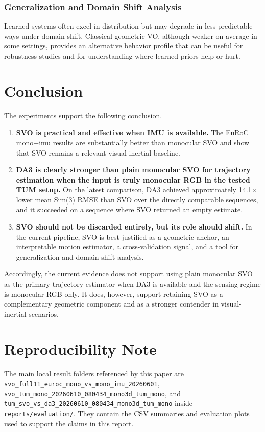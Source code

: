 \documentclass[conference]{IEEEtran}
\begin{document}
\subsubsection{Generalization and Domain Shift Analysis}
Learned systems often excel in-distribution but may degrade in less predictable ways under domain shift. Classical geometric VO, although weaker on average in some settings, provides an alternative behavior profile that can be useful for robustness studies and for understanding where learned priors help or hurt.

\section{Conclusion}
The experiments support the following conclusion.
\begin{enumerate}
\item \textbf{SVO is practical and effective when IMU is available.} The EuRoC mono+imu results are substantially better than monocular SVO and show that SVO remains a relevant visual-inertial baseline.
\item \textbf{DA3 is clearly stronger than plain monocular SVO for trajectory estimation when the input is truly monocular RGB in the tested TUM setup.} On the latest comparison, DA3 achieved approximately 14.1$\times$ lower mean Sim(3) RMSE than SVO over the directly comparable sequences, and it succeeded on a sequence where SVO returned an empty estimate.
\item \textbf{SVO should not be discarded entirely, but its role should shift.} In the current pipeline, SVO is best justified as a geometric anchor, an interpretable motion estimator, a cross-validation signal, and a tool for generalization and domain-shift analysis.
\end{enumerate}

Accordingly, the current evidence does not support using plain monocular SVO as the primary trajectory estimator when DA3 is available and the sensing regime is monocular RGB only. It does, however, support retaining SVO as a complementary geometric component and as a stronger contender in visual-inertial scenarios.

\section*{Reproducibility Note}
The main local result folders referenced by this paper are
\texttt{svo\_full11\_euroc\_mono\_vs\_mono\_imu\_20260601},
\texttt{svo\_tum\_mono\_20260610\_080434\_mono3d\_tum\_mono}, and
\texttt{tum\_svo\_vs\_da3\_20260610\_080434\_mono3d\_tum\_mono} inside
\texttt{reports/evaluation/}. They contain the CSV summaries and evaluation plots used to support the claims in this report.



\end{document}
